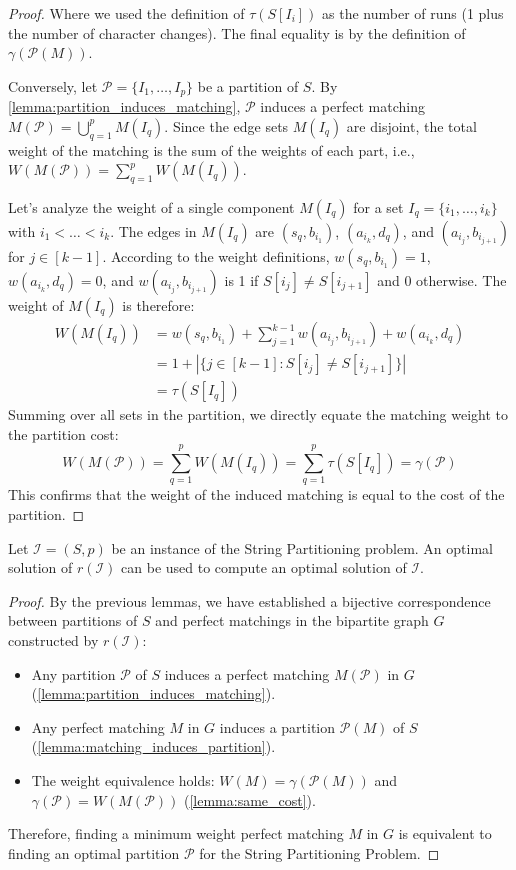 \begin{proof}
    Where we used the definition of $\tau(S[I_i])$ as the number of runs (1 plus the number of character changes). The final equality is by the definition of $\gamma(\mathcal{P}(M))$.
    
    Conversely, let $\mathcal{P} = \{I_1, \ldots, I_p\}$ be a partition of $S$. By \cref{lemma:partition_induces_matching}, $\mathcal{P}$ induces a perfect matching $M(\mathcal{P}) = \bigcup_{q=1}^p M(I_q)$. Since the edge sets $M(I_q)$ are disjoint, the total weight of the matching is the sum of the weights of each part, i.e., $W(M(\mathcal{P})) = \sum_{q=1}^p W(M(I_q))$.

    Let's analyze the weight of a single component $M(I_q)$ for a set $I_q = \{i_1, \dots, i_k\}$ with $i_1 < \dots < i_k$. The edges in $M(I_q)$ are $(s_q, b_{i_1})$, $(a_{i_k}, d_q)$, and $(a_{i_j}, b_{i_{j+1}})$ for $j \in [k-1]$. According to the weight definitions, $w(s_q, b_{i_1})=1$, $w(a_{i_k}, d_q)=0$, and $w(a_{i_j}, b_{i_{j+1}})$ is 1 if $S[i_j] \neq S[i_{j+1}]$ and 0 otherwise. The weight of $M(I_q)$ is therefore:
    \begin{align*}
        W(M(I_q)) &= w(s_q, b_{i_1}) + \sum_{j=1}^{k-1} w(a_{i_j}, b_{i_{j+1}}) + w(a_{i_k}, d_q) \\
                  &= 1 + |\{j \in [k-1] : S[i_j] \neq S[i_{j+1}]\}| \\
                  &= \tau(S[I_q])
    \end{align*}
    Summing over all sets in the partition, we directly equate the matching weight to the partition cost:
    $$
        W(M(\mathcal{P})) = \sum_{q=1}^p W(M(I_q)) = \sum_{q=1}^p \tau(S[I_q]) = \gamma(\mathcal{P})
    $$
    This confirms that the weight of the induced matching is equal to the cost of the partition.
\end{proof}

\begin{theorem}
    Let $\mathcal{I}=(S,p)$ be an instance of the String Partitioning problem. An optimal solution of $r(\mathcal{I})$ can be used to compute an optimal solution of $\mathcal{I}$.
\end{theorem}
\begin{proof}
    By the previous lemmas, we have established a bijective correspondence between partitions of $S$ and perfect matchings in the bipartite graph $G$ constructed by $r(\mathcal{I})$:
    \begin{itemize}
        \item Any partition $\mathcal{P}$ of $S$ induces a perfect matching $M(\mathcal{P})$ in $G$ (\cref{lemma:partition_induces_matching}).
        \item Any perfect matching $M$ in $G$ induces a partition $\mathcal{P}(M)$ of $S$ (\cref{lemma:matching_induces_partition}).
        \item The weight equivalence holds: $W(M) = \gamma(\mathcal{P}(M))$ and $\gamma(\mathcal{P}) = W(M(\mathcal{P}))$ (\cref{lemma:same_cost}).
    \end{itemize}
    
    Therefore, finding a minimum weight perfect matching $M$ in $G$ is equivalent to finding an optimal partition $\mathcal{P}$ for the String Partitioning Problem.
\end{proof}

